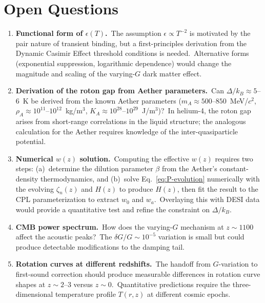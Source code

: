 \documentclass[12pt,letterpaper]{article}
\newcommand{\rhoa}{\rho_{\!A}}
\newcommand{\Ka}{K_{\!A}}
\begin{document}
\section{Open Questions}
\label{sec:open}

\begin{enumerate}[leftmargin=2em]
  \item \textbf{Functional form of $\epsilon(T)$.}\ The assumption $\epsilon
    \propto T^{-2}$ is motivated by the pair nature of transient binding, but a
    first-principles derivation from the Dynamic Casimir Effect threshold
    conditions is needed.\ Alternative forms (exponential suppression,
    logarithmic dependence) would change the magnitude and scaling of the
    varying-$G$ dark matter effect.

  \item \textbf{Derivation of the roton gap from Aether parameters.}\ Can
    $\Delta/k_B \approx 5$--$6$~K be derived from the known Aether parameters
    ($m_A \approx 500$--$850$~MeV/$c^2$, $\rhoa \approx 10^{11}$--$10^{12}$~kg/m$^3$,
    $\Ka \approx 10^{28}$--$10^{29}$~J/m$^3$)?\ In helium-4, the roton gap
    arises from short-range correlations in the liquid structure; the analogous
    calculation for the Aether requires knowledge of the inter-quasiparticle
    potential.

  \item \textbf{Numerical $w(z)$ solution.}\ Computing the effective $w(z)$
    requires two steps: (a)~determine the dilution parameter $\beta$ from
    the Aether's constant-density thermodynamics, and (b)~solve
    Eq.~\ref{eq:P-evolution} numerically with the evolving $\zeta_n(z)$ and
    $H(z)$ to produce $H(z)$, then fit the result to the CPL parameterization
    to extract $w_0$ and $w_a$.\ Overlaying this with DESI data would provide
    a quantitative test and refine the constraint on $\Delta/k_B$.

  \item \textbf{CMB power spectrum.}\ How does the varying-$G$ mechanism at
    $z \sim 1100$ affect the acoustic peaks?\ The $\delta G/G \sim 10^{-5}$
    variation is small but could produce detectable modifications to the
    damping tail.

  \item \textbf{Rotation curves at different redshifts.}\ The handoff from
    $G$-variation to first-sound correction should produce measurable differences
    in rotation curve shapes at $z \sim 2$--$3$ versus $z \sim 0$.\ Quantitative
    predictions require the three-dimensional temperature profile $T(r,z)$ at
    different cosmic epochs.


\end{enumerate}
\end{document}
